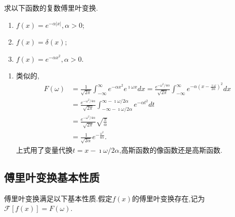 \begin{examplebox}{
求以下函数的复数傅里叶变换.
\begin{enumerate}
    \item $f(x) = e^{-\alpha |x|}, \alpha > 0$;
    \item $f(x) = \delta (x)$;
    \item $f(x) = e^{-\alpha x^2}, \alpha > 0$.
\end{enumerate}
}
\begin{enumerate}
    \item 类似的,  
    \begin{align}
        F(\omega) &=\frac{1}{\sqrt{2 \pi}} \int_{-\infty}^{\infty} e^{-\alpha x^2} e^{\imath \omega x} d x \nonumber
        = \frac{ e^{-\omega^2 / 4\alpha }}{\sqrt{2 \pi}} \int_{-\infty}^{\infty} e^{-\alpha  \left( x - \frac{\imath \omega}{2\alpha} \right)^2}  d x
        \nonumber
        \\
        & = \frac{ e^{-\omega^2 / 4\alpha }}{\sqrt{2 \pi}} \int_{-\infty - \imath \omega / 2\alpha}^{\infty - \imath \omega / 2\alpha} e^{-\alpha t^2} dt
        \nonumber
        \\
        & = \frac{ e^{-\omega^2 / 4\alpha }}{\sqrt{2 \pi}} \sqrt{\frac{\pi}{\alpha}} 
        \nonumber
        \\
            & = \frac{1}{\sqrt{2\alpha}} e^{- \frac{\omega^2}{4\alpha}} \nonumber .
    \end{align}
    上式用了变量代换$t = x - \imath \omega /2 \alpha$,高斯函数的像函数还是高斯函数.
\end{enumerate}
\end{examplebox}


\subsection{傅里叶变换基本性质}
傅里叶变换满足以下基本性质.假定$f(x)$的傅里叶变换存在,记为$\mathcal{F}[f(x)] = F(\omega)$.

